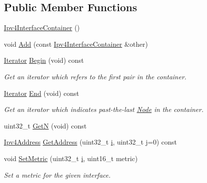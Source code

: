 \subsection*{Public Member Functions}
\begin{DoxyCompactItemize}
\item 
\hyperlink{classns3_1_1Ipv4InterfaceContainer_af501b5fa9d6e1cc316ba259609da608e}{Ipv4\+Interface\+Container} ()
\item 
void \hyperlink{classns3_1_1Ipv4InterfaceContainer_ae5e7881307c8d49c7606669ded6ac3d6}{Add} (const \hyperlink{classns3_1_1Ipv4InterfaceContainer}{Ipv4\+Interface\+Container} \&other)
\item 
\hyperlink{classns3_1_1Ipv4InterfaceContainer_acedc286abfd3db405dfca5ddd73fd1d7}{Iterator} \hyperlink{classns3_1_1Ipv4InterfaceContainer_a1f39f80de81e0b74362867a8f89264c9}{Begin} (void) const 
\begin{DoxyCompactList}\small\item\em Get an iterator which refers to the first pair in the container. \end{DoxyCompactList}\item 
\hyperlink{classns3_1_1Ipv4InterfaceContainer_acedc286abfd3db405dfca5ddd73fd1d7}{Iterator} \hyperlink{classns3_1_1Ipv4InterfaceContainer_aa3173d4d097db7ebf17fc1cb84d06596}{End} (void) const 
\begin{DoxyCompactList}\small\item\em Get an iterator which indicates past-\/the-\/last \hyperlink{classns3_1_1Node}{Node} in the container. \end{DoxyCompactList}\item 
uint32\+\_\+t \hyperlink{classns3_1_1Ipv4InterfaceContainer_a8d565289d84cd90ef806d0f86e6235f9}{GetN} (void) const 
\item 
\hyperlink{classns3_1_1Ipv4Address}{Ipv4\+Address} \hyperlink{classns3_1_1Ipv4InterfaceContainer_ae63208dcd222be986822937ee4aa828c}{Get\+Address} (uint32\+\_\+t \hyperlink{lte__uplink__power__control_8m_a6f6ccfcf58b31cb6412107d9d5281426}{i}, uint32\+\_\+t j=0) const 
\item 
void \hyperlink{classns3_1_1Ipv4InterfaceContainer_a94248347eb8df7826f8576234fc2d1be}{Set\+Metric} (uint32\+\_\+t \hyperlink{lte__uplink__power__control_8m_a6f6ccfcf58b31cb6412107d9d5281426}{i}, uint16\+\_\+t metric)
\begin{DoxyCompactList}\small\item\em Set a metric for the given interface. \end{DoxyCompactList}\item 

\end{DoxyCompactItemize}
